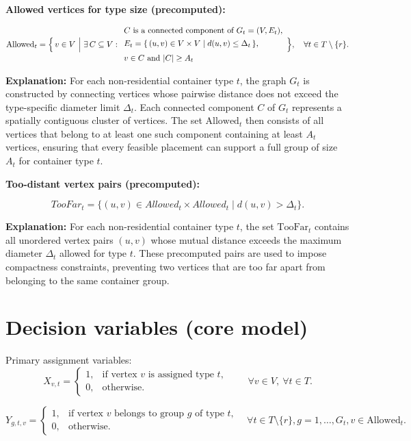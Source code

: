 \documentclass[12pt,a4paper]{article}
\begin{document}
\vspace{1em}
\textbf{Allowed vertices for type size (precomputed):}


\[
\text{Allowed}_t
= 
\Bigl\{\, 
v \in V
\ \Big|\
\exists\, C \subseteq V :
\begin{array}{l}
C \text{ is a connected component of } G_t = (V, E_t), \\[4pt]
E_t = \{\, (u,v) \in V \times V \mid d(u,v) \le \Delta_t \,\}, \\[6pt]
v \in C \text{ and } |C| \ge A_t
\end{array}
\Bigr\},
\quad 
\forall t \in T \setminus \{r\}.
\]

\textbf{Explanation:} 
For each non-residential container type $t$, the graph $G_t$ is constructed by connecting 
vertices whose pairwise distance does not exceed the type-specific diameter limit $\Delta_t$.
Each connected component $C$ of $G_t$ represents a spatially contiguous cluster of vertices.
The set $\text{Allowed}_t$ then consists of all vertices that belong to at least one such component 
containing at least $A_t$ vertices, ensuring that every feasible placement 
can support a full group of size $A_t$ for container type $t$.

\vspace{1.5em}
\textbf{Too-distant vertex pairs (precomputed):}


\[
TooFar_t = \{(u,v) \in Allowed_t \times Allowed_t \mid d(u,v) > \Delta_t\}.
\]

\textbf{Explanation:}
For each non-residential container type $t$, 
the set $\text{TooFar}_t$ contains all unordered vertex pairs $(u,v)$ 
whose mutual distance exceeds the maximum diameter $\Delta_t$ allowed for type $t$.
These precomputed pairs are used to impose compactness constraints,
preventing two vertices that are too far apart from belonging to the same container group.

\section{Decision variables (core model)}

Primary assignment variables:
\[
X_{v,t} =
\begin{cases}
1, & \text{if vertex } v \text{ is assigned type } t,\\[4pt]
0, & \text{otherwise.}
\end{cases}
\qquad \forall v\in V,\ \forall t\in T.
\]

\[
Y_{g,t,v} = 
\begin{cases}
1, & \text{if vertex $v$ belongs to group $g$ of type $t$,}\\
0, & \text{otherwise.}
\end{cases}
\quad \forall t \in T \setminus \{r\}, g = 1,\dots,G_t,v \in \text{Allowed}_t.  
\]
\end{document}
